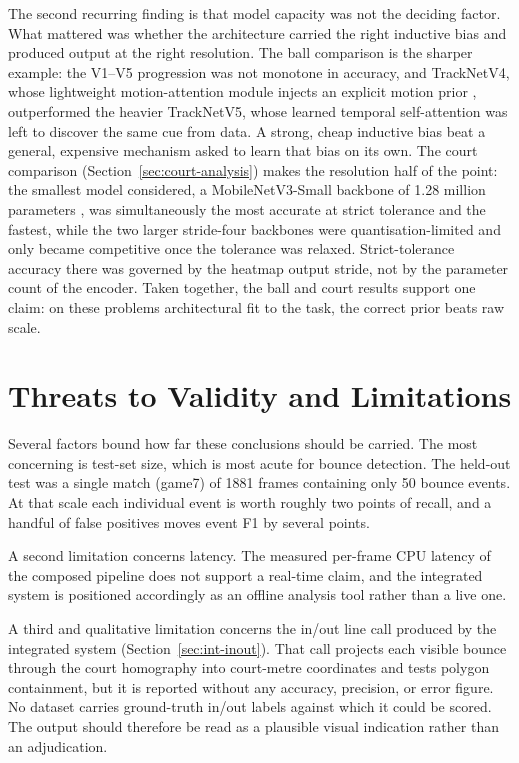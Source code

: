The second recurring finding is that model capacity was not the deciding factor. What mattered was whether the architecture carried the right inductive bias and produced output at the right resolution. The ball comparison is the sharper example: the V1--V5 progression was not monotone in accuracy, and TrackNetV4, whose lightweight motion-attention module injects an explicit motion prior \cite{raj2025tracknetv4}, outperformed the heavier TrackNetV5, whose learned temporal self-attention was left to discover the same cue from data. A strong, cheap inductive bias beat a general, expensive mechanism asked to learn that bias on its own. The court comparison (Section~\ref{sec:court-analysis}) makes the resolution half of the point: the smallest model considered, a MobileNetV3-Small backbone of 1.28 million parameters \cite{howard2019mobilenetv3}, was simultaneously the most accurate at strict tolerance and the fastest, while the two larger stride-four backbones were quantisation-limited and only became competitive once the tolerance was relaxed. Strict-tolerance accuracy there was governed by the heatmap output stride, not by the parameter count of the encoder. Taken together, the ball and court results support one claim: on these problems architectural fit to the task, the correct prior beats raw scale.

\section{Threats to Validity and Limitations}
\label{sec:disc-limitations}

Several factors bound how far these conclusions should be carried. The most concerning is test-set size, which is most acute for bounce detection. The held-out test was a single match (game7) of 1881 frames containing only 50 bounce events. At that scale each individual event is worth roughly two points of recall, and a handful of false positives moves event F1 by several points.

A second limitation concerns latency. The measured per-frame CPU latency of the composed pipeline does not support a real-time claim, and the integrated system is positioned accordingly as an offline analysis tool rather than a live one.

A third and qualitative limitation concerns the in/out line call produced by the integrated system (Section~\ref{sec:int-inout}). That call projects each visible bounce through the court homography into court-metre coordinates and tests polygon containment, but it is reported without any accuracy, precision, or error figure. No dataset carries ground-truth in/out labels against which it could be scored. The output should therefore be read as a plausible visual indication rather than an adjudication.

